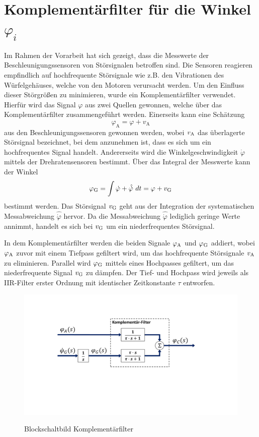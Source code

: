 \section{Komplementärfilter für die Winkel $\varphi_i$}
Im Rahmen der Vorarbeit hat sich gezeigt, dass die Messwerte der Beschleunigungssensoren von Störsignalen betroffen sind. Die Sensoren reagieren empfindlich auf hochfrequente Störsignale wie z.B. den Vibrationen des Würfelgehäuses, welche von den Motoren verursacht werden. Um den Einfluss dieser Störgrößen zu minimieren, wurde ein Komplementärfilter verwendet. Hierfür wird das Signal $\varphi$ aus zwei Quellen gewonnen, welche über das Komplementärfilter zusammengeführt werden. Einerseits kann eine Schätzung
\begin{equation}
\varphi_{\text{A}} = \varphi + v_{\text{A}}
\end{equation}
aus den Beschleunigungssensoren gewonnen werden, wobei $v_{\text{A}}$ das überlagerte Störsignal bezeichnet, bei dem anzunehmen ist, dass es sich um ein hochfrequentes Signal handelt. Andererseits wird die Winkelgeschwindigkeit $\dot{\varphi}$ mittels der Drehratensensoren bestimmt. Über das Integral der Messwerte kann der Winkel
\begin{equation}
\varphi_{\text{G}} = \int \dot{\varphi} + \hat{\dot{\varphi}}\ dt = \varphi + v_{\text{G}} 
\end{equation}
bestimmt werden. Das Störsignal $v_{\text{G}}$ geht aus der Integration der systematischen Messabweichung $\hat{\dot{\varphi}}$ hervor. Da die Messabweichung $\hat{\dot{\varphi}}$ lediglich geringe Werte annimmt, handelt es sich bei $v_{\text{G}}$ um ein niederfrequentes Störsignal.

In dem Komplementärfilter werden die beiden Signale $\varphi_{\text{A}}$ und $\varphi_{\text{G}}$ addiert, wobei $\varphi_{\text{A}}$ zuvor mit einem Tiefpass gefiltert wird, um das hochfrequente Störsignale $v_{\text{A}}$ zu eliminieren. Parallel wird $\varphi_{\text{G}}$ mittels eines Hochpasses gefiltert, um das niederfrequente Signal $v_{\text{G}}$ zu dämpfen. Der Tief- und Hochpass wird jeweils als IIR-Filter erster Ordnung mit identischer Zeitkonstante $\tau$ entworfen.
\begin{figure}[h!]
\includegraphics[width=1\linewidth, trim={2cm 7.5cm 4cm 3.5cm}, clip]{img/CompFilter}
\label{bsb_kompfilter}
\caption{Blockschaltbild Komplementärfilter}
\end{figure}


